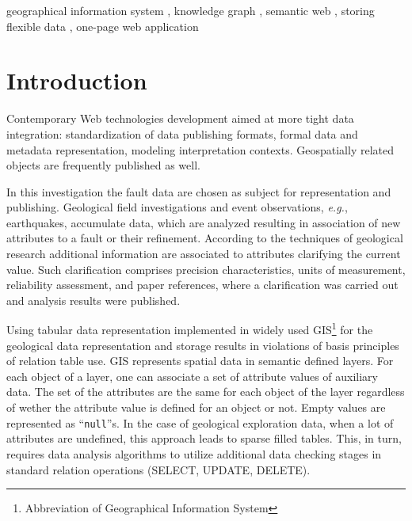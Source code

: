 \documentclass[
]{ceurart}
\begin{document}
\begin{keywords}
  geographical information system \sep
  knowledge graph \sep
  semantic web \sep
  storing flexible data \sep
  one-page web application
\end{keywords}

\maketitle

\section{Introduction}

Contemporary Web technologies development aimed at more tight data integration: standardization of data publishing formats, formal data and metadata representation, modeling interpretation contexts.  Geospatially related objects are frequently published as well.

In this investigation the fault data are chosen as subject for representation and publishing.  Geological field investigations and event observations, \emph{e.g.}, earthquakes, accumulate data, which are analyzed resulting in association of new attributes to a fault or their refinement.  According to the techniques of geological research additional information are associated to attributes clarifying the current value.  Such clarification comprises precision characteristics, units of measurement, reliability assessment, and paper references, where a clarification was carried out and analysis results were published.

Using tabular data representation implemented in widely used GIS\footnote{Abbreviation of Geographical Information System} for the geological data representation and storage results in violations of basis principles of relation table use.  GIS represents spatial data in semantic defined layers.  For each object of a layer, one can associate a set of attribute values of auxiliary data.  The set of the attributes are the same for each object of the layer regardless of wether the attribute value is defined for an object or not.  Empty values are represented as ``\texttt{null}''s.  In the case of geological exploration data, when a lot of attributes are undefined, this approach leads to sparse filled tables.  This, in turn, requires data analysis algorithms to utilize additional data checking stages in standard relation operations (SELECT, UPDATE, DELETE).
\end{document}
